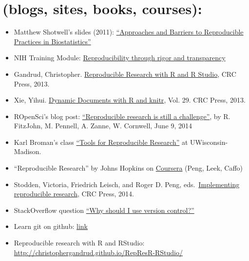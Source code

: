 \documentclass[
  12pt,
]{book}
\providecommand{\tightlist}{%
  \setlength{\itemsep}{0pt}\setlength{\parskip}{0pt}}
\begin{document}
\hypertarget{blogs-sites-books-courses}{%
\section{(blogs, sites, books, courses):}\label{blogs-sites-books-courses}}

\begin{itemize}
\tightlist
\item
  Matthew Shotwell's slides (2011): \href{https://rstudio-pubs-static.s3.amazonaws.com/177032_7be0bffdc2274d679c03b7228ac7b91f.html}{``Approaches and Barriers to Reproducible Practices in Biostatistics''}
\item
  NIH Training Module: \href{https://grants.nih.gov/reproducibility/module_1/presentation.html}{Reproducibility through rigor and transparency}
\item
  Gandrud, Christopher. \href{https://englianhu.files.wordpress.com/2016/01/reproducible-research-with-r-and-studio-2nd-edition.pdf}{Reproducible Research with R and R Studio}, CRC Press, 2013.
\item
  Xie, Yihui. \href{http://static.latexstudio.net/wp-content/uploads/2014/03/DDR-Yihui-Xie-Chap1-3.pdf}{Dynamic Documents with R and knitr}, Vol. 29. CRC Press, 2013.
\item
  ROpenSci's blog post: \href{https://ropensci.org/blog/2014/06/09/reproducibility/}{``Reproducible research is still a challenge''}, by R. FitzJohn, M. Pennell, A. Zanne, W. Cornwell, June 9, 2014
\item
  Karl Broman's class \href{http://kbroman.org/Tools4RR/}{``Tools for Reproducible Research''} at UWisconsin-Madison.
\item
  ``Reproducible Research'' by Johns Hopkins on \href{https://www.coursera.org/learn/reproducible-research}{Coursera} (Peng, Leek, Caffo)
\item
  Stodden, Victoria, Friedrich Leisch, and Roger D. Peng, eds.~\href{https://www.jstatsoft.org/article/view/v061b02/v61b02.pdf}{Implementing reproducible research}, CRC Press, 2014.
\item
  StackOverflow question \href{https://stackoverflow.com/questions/1408450/why-should-i-use-version-control\#:~:text=Version\%20control\%20gives\%20you\%20the,using\%20tools.}{``Why should I use version control?''}
\item
  Learn git on github: \href{https://try.github.io/levels/1/challenges/1}{link}
\item
  Reproducible research with R and RStudio: \url{http://christophergandrud.github.io/RepResR-RStudio/}

\end{itemize}
\end{document}
